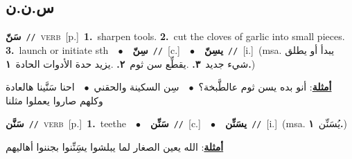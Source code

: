\documentclass[10pt,a4paper,twoside]{article} %
\begin{document}
\begin{multicols}{2}
\vspace{-3mm}
\subsection*{\color{blue}\foreignlanguage{arabic}{س.ن.ن}\color{blue}{}} 

{\setlength\topsep{0pt}\textbf{\foreignlanguage{arabic}{سَنّ}}\ {\color{gray}\texttt{//}\color{black}}\ \textsc{verb}\ [p.]\ \textbf{1.}~sharpen tools.  \textbf{2.}~cut the cloves of garlic into small pieces.  \textbf{3.}~launch or initiate sth\ \ $\bullet$\ \ \setlength\topsep{0pt}\textbf{\foreignlanguage{arabic}{سِنّ}}\ {\color{gray}\texttt{//}\color{black}}\ [c.]\ \ $\bullet$\ \ \setlength\topsep{0pt}\textbf{\foreignlanguage{arabic}{يسِنّ}}\ {\color{gray}\texttt{//}\color{black}}\ [i.]\ \color{gray}(msa. \foreignlanguage{arabic}{يبدأ أو يطلق شيء جديد}~\foreignlanguage{arabic}{\textbf{٣.}}  .\foreignlanguage{arabic}{يقطِّع سن ثوم}~\foreignlanguage{arabic}{\textbf{٢.}}  .\foreignlanguage{arabic}{يزيد حدة الأدوات الحادة}~\foreignlanguage{arabic}{\textbf{١.}})\color{black}\  \begin{flushright}\color{gray}\foreignlanguage{arabic}{\textbf{\underline{\foreignlanguage{arabic}{أمثلة}}}: أنو بده يسن ثوم عالطَّبخة؟\ $\bullet$\ \  سِن السكينة والحقني\ $\bullet$\ \  احنا سَنَّينا هالعادة وكلهم صاروا يعملوا مثلنا}\end{flushright}\color{black}} \vspace{2mm}

{\setlength\topsep{0pt}\textbf{\foreignlanguage{arabic}{سَنَّن}}\ {\color{gray}\texttt{//}\color{black}}\ \textsc{verb}\ [p.]\ \textbf{1.}~teethe\ \ $\bullet$\ \ \setlength\topsep{0pt}\textbf{\foreignlanguage{arabic}{سَنِّن}}\ {\color{gray}\texttt{//}\color{black}}\ [c.]\ \ $\bullet$\ \ \setlength\topsep{0pt}\textbf{\foreignlanguage{arabic}{يسَنِّن}}\ {\color{gray}\texttt{//}\color{black}}\ [i.]\ \color{gray}(msa. \foreignlanguage{arabic}{يُسَنِّن}~\foreignlanguage{arabic}{\textbf{١.}})\color{black}\  \begin{flushright}\color{gray}\foreignlanguage{arabic}{\textbf{\underline{\foreignlanguage{arabic}{أمثلة}}}: الله يعين الصغار لما يبلشوا يسَِنِّنوا بجننوا أهاليهم}\end{flushright}\color{black}} \vspace{2mm}


\end{multicols}
\end{document}
